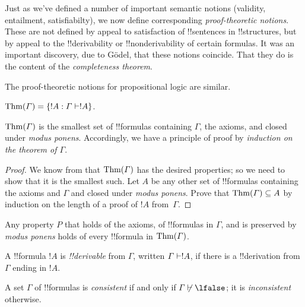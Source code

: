 \documentclass[../../include/open-logic-section]{subfiles}
\begin{document}

\begin{explain}
Just as we've defined a number of important semantic notions
(validity, entailment, satisfiabilty), we now define corresponding
\emph{proof-theoretic notions}.  These are not defined by appeal to
satisfaction of !!{sentence}s in !!{structure}s, but by appeal to the
!!{derivability} or !!{nonderivability} of certain formulas.  It was
an important discovery, due to G\"odel, that these notions coincide.
That they do is the content of the \emph{completeness theorem}.

The proof-theoretic notions for propositional logic are similar.
\end{explain}

\begin{defn}[Theorems]
$\Thms{\Gamma} = \Setabs{!A}{\Gamma \Proves !A}$. 
\end{defn}

$\mathrm{Thm}(\Gamma)$ is the smallest set of !!{formula}s containing
$\Gamma$, the axioms, and closed under \emph{modus
  ponens}. Accordingly, we have a principle of proof by
\emph{induction on the theorem of $\Gamma$}.


\begin{proof}
We know from  that $\mathrm{Thm}(\Gamma)$ has the
desired properties; so we need to show that it is the smallest
such. Let $A$ be any other set of !!{formula}s containing the axioms
and $\Gamma$ and closed under \emph{modus ponens}. Prove that
$\mathrm{Thm}(\Gamma) \subseteq A$ by induction on the length of a proof of
$!A$ from~$\Gamma$.
\end{proof}

\begin{cor}
Any property $P$ that holds of the axioms, of !!{formula}s in
$\Gamma$, and is preserved by \emph{modus ponens} holds of every
!!{formula} in $\mathrm{Thm}(\Gamma)$.
\end{cor}

\begin{defn}[!!^{derivability}]
A !!{formula} $!A$ is \emph{!!{derivable}} from $\Gamma$, written
$\Gamma \Proves !A$, if there is a !!{derivation} from $\Gamma$ ending
in $!A$.
\end{defn}

\begin{defn}[Consistency]
A set $\Gamma$ of !!{formula}s is \emph{consistent} if and only if
$\Gamma\Proves/ \lfalse$; it is \emph{inconsistent} otherwise.
\end{defn}
\end{document}
